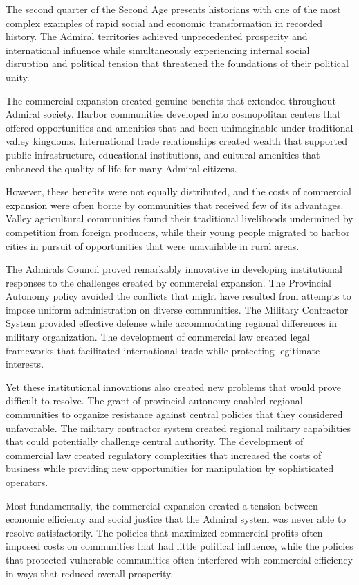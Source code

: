 The second quarter of the Second Age presents historians with one of the
most complex examples of rapid social and economic transformation in
recorded history. The Admiral territories achieved unprecedented
prosperity and international influence while simultaneously experiencing
internal social disruption and political tension that threatened the
foundations of their political unity.

The commercial expansion created genuine benefits that extended
throughout Admiral society. Harbor communities developed into
cosmopolitan centers that offered opportunities and amenities that had
been unimaginable under traditional valley kingdoms. International trade
relationships created wealth that supported public infrastructure,
educational institutions, and cultural amenities that enhanced the
quality of life for many Admiral citizens.

However, these benefits were not equally distributed, and the costs of
commercial expansion were often borne by communities that received few
of its advantages. Valley agricultural communities found their
traditional livelihoods undermined by competition from foreign
producers, while their young people migrated to harbor cities in pursuit
of opportunities that were unavailable in rural areas.

The Admiral\textquotesingle s Council proved remarkably innovative in
developing institutional responses to the challenges created by
commercial expansion. The Provincial Autonomy policy avoided the
conflicts that might have resulted from attempts to impose uniform
administration on diverse communities. The Military Contractor System
provided effective defense while accommodating regional differences in
military organization. The development of commercial law created legal
frameworks that facilitated international trade while protecting
legitimate interests.

Yet these institutional innovations also created new problems that would
prove difficult to resolve. The grant of provincial autonomy enabled
regional communities to organize resistance against central policies
that they considered unfavorable. The military contractor system created
regional military capabilities that could potentially challenge central
authority. The development of commercial law created regulatory
complexities that increased the costs of business while providing new
opportunities for manipulation by sophisticated operators.

Most fundamentally, the commercial expansion created a tension between
economic efficiency and social justice that the Admiral system was never
able to resolve satisfactorily. The policies that maximized commercial
profits often imposed costs on communities that had little political
influence, while the policies that protected vulnerable communities
often interfered with commercial efficiency in ways that reduced overall
prosperity.

